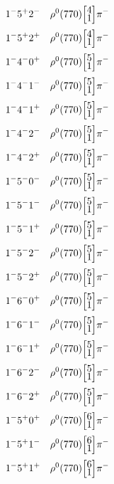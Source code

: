 \documentclass[10pt,a4paper]{article}
\def\dst{\displaystyle}
\def\vsp{\hbox{\vrule height12.5pt depth3.5pt width0pt}}
\def\ells#1#2{\Big[\hskip-5pt\vsp\begin{array}{c}\dst#1\\[-4pt]\dst#2\end{array}\vsp\hskip-5pt\Big]}
\begin{document}
\begin{align*} 
 \begin{aligned}
1^{-}5^{+}2^{-}\quad & \rho^0(770)\ells{4}{1}\pi^-\\
1^{-}5^{+}2^{+}\quad & \rho^0(770)\ells{4}{1}\pi^-\\
1^{-}4^{-}0^{+}\quad & \rho^0(770)\ells{5}{1}\pi^-\\
1^{-}4^{-}1^{-}\quad & \rho^0(770)\ells{5}{1}\pi^-\\
1^{-}4^{-}1^{+}\quad & \rho^0(770)\ells{5}{1}\pi^-\\
1^{-}4^{-}2^{-}\quad & \rho^0(770)\ells{5}{1}\pi^-\\
1^{-}4^{-}2^{+}\quad & \rho^0(770)\ells{5}{1}\pi^-\\
1^{-}5^{-}0^{-}\quad & \rho^0(770)\ells{5}{1}\pi^-\\
1^{-}5^{-}1^{-}\quad & \rho^0(770)\ells{5}{1}\pi^-\\
1^{-}5^{-}1^{+}\quad & \rho^0(770)\ells{5}{1}\pi^-\\
1^{-}5^{-}2^{-}\quad & \rho^0(770)\ells{5}{1}\pi^-\\
1^{-}5^{-}2^{+}\quad & \rho^0(770)\ells{5}{1}\pi^-\\
1^{-}6^{-}0^{+}\quad & \rho^0(770)\ells{5}{1}\pi^-\\
1^{-}6^{-}1^{-}\quad & \rho^0(770)\ells{5}{1}\pi^-\\
1^{-}6^{-}1^{+}\quad & \rho^0(770)\ells{5}{1}\pi^-\\
1^{-}6^{-}2^{-}\quad & \rho^0(770)\ells{5}{1}\pi^-\\
1^{-}6^{-}2^{+}\quad & \rho^0(770)\ells{5}{1}\pi^-\\
1^{-}5^{+}0^{+}\quad & \rho^0(770)\ells{6}{1}\pi^-\\
1^{-}5^{+}1^{-}\quad & \rho^0(770)\ells{6}{1}\pi^-\\
1^{-}5^{+}1^{+}\quad & \rho^0(770)\ells{6}{1}\pi^-\\
\end{aligned} 
 \end{align*}\pagebreak
\end{document}
